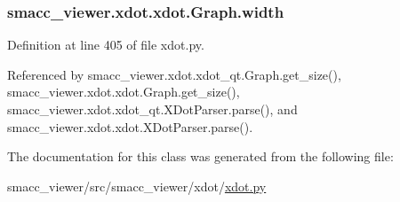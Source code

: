 \subsubsection[{\texorpdfstring{width}{width}}]{\setlength{\rightskip}{0pt plus 5cm}smacc\+\_\+viewer.\+xdot.\+xdot.\+Graph.\+width}\hypertarget{classsmacc__viewer_1_1xdot_1_1xdot_1_1Graph_a85c4c590b6e678fa36f5765a7a55f070}{}\label{classsmacc__viewer_1_1xdot_1_1xdot_1_1Graph_a85c4c590b6e678fa36f5765a7a55f070}


Definition at line 405 of file xdot.\+py.



Referenced by smacc\+\_\+viewer.\+xdot.\+xdot\+\_\+qt.\+Graph.\+get\+\_\+size(), smacc\+\_\+viewer.\+xdot.\+xdot.\+Graph.\+get\+\_\+size(), smacc\+\_\+viewer.\+xdot.\+xdot\+\_\+qt.\+X\+Dot\+Parser.\+parse(), and smacc\+\_\+viewer.\+xdot.\+xdot.\+X\+Dot\+Parser.\+parse().



The documentation for this class was generated from the following file\+:\begin{DoxyCompactItemize}
\item 
smacc\+\_\+viewer/src/smacc\+\_\+viewer/xdot/\hyperlink{xdot_8py}{xdot.\+py}\end{DoxyCompactItemize}

